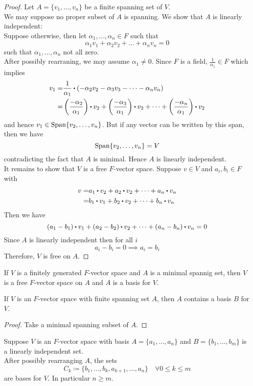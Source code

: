 \documentclass[../Main.tex]{subfiles}
\begin{document}
\begin{proof}
	Let $A=\{v_1,\dots,v_n\}$ be a finite spanning set of $V$.\\
	We may suppose no proper subset of $A$ is spanning. We show that $A$ is linearly independent:\\
	Suppose otherwise, then let $\alpha_1,\dots,\alpha_n\in F$ such that
	\[\alpha_1v_1+\alpha_2v_2+\dots+\alpha_nv_n=0\]
	such that $\alpha_1,\dots,\alpha_n$ not all zero.\\
	After possibly rearraning, we may assume $\alpha_1\ne 0$. Since $F$ is a field, $\frac{1}{\alpha_1}\in F$ which implies
	\begin{align*}
	v_1 =& \frac{1}{\alpha_1}\rdot \left(-\alpha_2v_2-\alpha_3v_3-\dots-\alpha_nv_n\right)\\
	=&\left(\frac{-\alpha_2}{\alpha_1}\right)\rdot v_2+\left(\frac{-\alpha_3}{\alpha_1}\right)\rdot v_2+\dots+\left(\frac{-\alpha_n}{\alpha_1}\right)\rdot v_2
	\end{align*}
	and hence $v_1\in \operatorname{Span}\{v_2,\dots,v_n\}$. But if any vector can be written by this span, then we have
	\[\operatorname{Span}\{v_2,\dots,v_n\}=V\]
	contradicting the fact that $A$ is minimal.
	Hence $A$ is linearly independent.\\
	It remains to show that $V$ is a free $F$-vector space. Suppose $v\in V$ and $a_i,b_i\in F$ with
	\begin{align*}
	v=&a_1\rdot v_2+a_2\rdot v_2+\dots+a_n\rdot v_n\\
	=&b_1\rdot v_1+b_2\rdot v_2+\dots+b_n\rdot v_n
	\end{align*}
	Then we have
	\[(a_1-b_1)\rdot v_1+(a_2-b_2)\rdot v_2+\dots+(a_n-b_n)\rdot v_n=0\]
	Since $A$ is linearly independent then for all $i$
	\[a_i-b_i=0\implies a_i=b_i\] 
	Therefore, $V$ is free on $A$.
\end{proof}
\begin{crl}
	If $V$ is a finitely generated $F$-vector space and $A$ is a minimal spannig set, then $V$ is a free $F$-vector space on $A$ and $A$ is a basis for $V$.
\end{crl}
\begin{crl}
	If $V$ is an $F$-vector space with finite spanning set $A$, then $A$ contains a basis $B$ for $V$.
\end{crl}
\begin{proof}
	Take a minimal spanning subset of $A$.
\end{proof}
\begin{thm}
	Suppose $V$ is an $F$-vector space with basis $A=\{a_1,\dots,a_n\}$ and $B=\{b_1,\dots,b_m\}$ is a linearly independent set.\\
	After possibly rearranging $A$, the sets
	\[C_k \coloneqq \{b_1,\dots,b_k,a_{k+1},\dots,a_n\}\quad \forall 0\le k\le m\]
	are bases for $V$. In particular $n\ge m$.
\end{thm}
\end{document}
